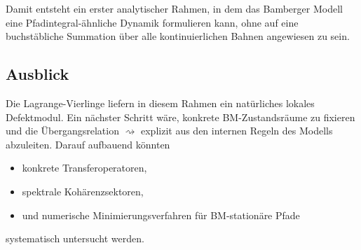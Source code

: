 \documentclass[11pt,a4paper]{article}
\theoremstyle{remark}
\begin{document}
	Damit entsteht ein erster analytischer Rahmen, in dem das Bamberger Modell eine Pfadintegral-ähnliche Dynamik formulieren kann, ohne auf eine buchstäbliche Summation über alle kontinuierlichen Bahnen angewiesen zu sein.
	
	\subsection{Ausblick}
	
	Die Lagrange-Vierlinge liefern in diesem Rahmen ein natürliches lokales Defektmodul. 
	Ein nächster Schritt wäre, konkrete BM-Zustandsräume zu fixieren und die Übergangsrelation \(\rightsquigarrow\) explizit aus den internen Regeln des Modells abzuleiten. 
	Darauf aufbauend könnten
	\begin{itemize}
		\item konkrete Transferoperatoren,
		\item spektrale Kohärenzsektoren,
		\item und numerische Minimierungsverfahren für BM-stationäre Pfade
	\end{itemize}
	systematisch untersucht werden.
	
\end{document}
